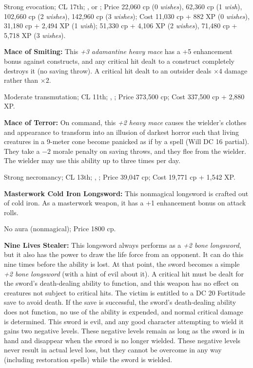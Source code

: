 Strong evocation; CL 17th; ,  or ; Price 22,060 cp (0 \emph{wishes}), 62,360 cp (1 \emph{wish}), 102,660 cp (2 \emph{wishes}), 142,960 cp (3 \emph{wishes}); Cost 11,030 cp + 882 XP (0 \emph{wishes}), 31,180 cp + 2,494 XP (1 \emph{wish}); 51,330 cp + 4,106 XP (2 \emph{wishes}), 71,480 cp + 5,718 XP (3 \emph{wishes}).


\textbf{Mace of Smiting:} This \emph{+3 adamantine heavy mace} has a +5 enhancement bonus against constructs, and any critical hit dealt to a construct completely destroys it (no saving throw). A critical hit dealt to an outsider deals $\times4$ damage rather than $\times2$.

Moderate transmutation; CL 11th; , ; Price 373,500 cp; Cost 337,500 cp + 2,880 XP.


\textbf{Mace of Terror:} On command, this \emph{+2 heavy mace} causes the wielder's clothes and appearance to transform into an illusion of darkest horror such that living creatures in a 9-meter cone become panicked as if by a  spell (Will DC 16 partial). They take a $-2$ morale penalty on saving throws, and they flee from the wielder. The wielder may use this ability up to three times per day.

Strong necromancy; CL 13th; , ; Price 39,047 cp; Cost 19,771 cp + 1,542 XP.


\textbf{Masterwork Cold Iron Longsword:} This nonmagical longsword is crafted out of cold iron. As a masterwork weapon, it has a +1 enhancement bonus on attack rolls.

No aura (nonmagical); Price 1800 cp.


\textbf{Nine Lives Stealer:} This longsword always performs as a \emph{+2 bone longsword}, but it also has the power to draw the life force from an opponent. It can do this nine times before the ability is lost. At that point, the sword becomes a simple \emph{+2 bone longsword} (with a hint of evil about it). A critical hit must be dealt for the sword's death-dealing ability to function, and this weapon has no effect on creatures not subject to critical hits. The victim is entitled to a DC 20 Fortitude save to avoid death. If the save is successful, the sword's death-dealing ability does not function, no use of the ability is expended, and normal critical damage is determined. This sword is evil, and any good character attempting to wield it gains two negative levels. These negative levels remain as long as the sword is in hand and disappear when the sword is no longer wielded. These negative levels never result in actual level loss, but they cannot be overcome in any way (including restoration spells) while the sword is wielded.

